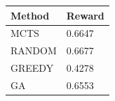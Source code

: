 \begin{tabular}{ll}
\hline
Method & Reward \\
\hline
  MCTS & 0.6647 \\
  RANDOM & 0.6677 \\
  GREEDY & 0.4278 \\
  GA & 0.6553 \\
\hline
\end{tabular}
